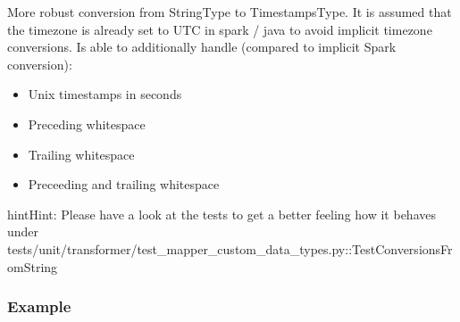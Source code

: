 \documentclass[a4paper,10pt, twoside,english]{sphinxmanual}
\begin{document}

\begin{fulllineitems}
\label{\detokenize{transformer/mapper:spooq2.transformer.mapper_custom_data_types._generate_select_expression_for_extended_string_to_timestamp}}
More robust conversion from StringType to TimestampsType. It is assumed that the
timezone is already set to UTC in spark / java to avoid implicit timezone conversions.
Is able to additionally handle (compared to implicit Spark conversion):
\begin{itemize}
\item {} 
Unix timestamps in seconds

\item {} 
Preceding whitespace

\item {} 
Trailing whitespace

\item {} 
Preceeding and trailing whitespace

\end{itemize}

\begin{sphinxadmonition}{hint}{Hint:}
Please have a look at the tests to get a better feeling how it behaves under
tests/unit/transformer/test\_mapper\_custom\_data\_types.py::TestConversionsFromString
\end{sphinxadmonition}
\subsubsection*{Example}


\end{fulllineitems}
\end{document}
